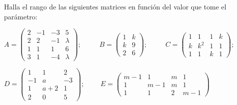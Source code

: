 \begin{ejre}
	Halla el rango de las siguientes matrices en función del valor que tome el parámetro:

\noindent $A=\left( \begin{matrix} 2&-1&-3&5\\2&2&-1&\lambda\\1&1&1&6\\3&1&-4&\lambda \end{matrix} \right); \;\;   \qquad 
B=\left( \begin{matrix} 1&k\\k&9\\2&6  \end{matrix} \right); \;\;   \qquad 
C=\left( \begin{matrix} 1&1&1&k\\k&k^2&1&1\\1&1&k&1  \end{matrix} \right);$

\noindent $D=\left( \begin{matrix} 1&1&2\\-1&a&-3\\1&a+2&1\\2&0&5  \end{matrix} \right); \;  \qquad 
E=\left( \begin{matrix} m-1&1&m&1\\1&m-1&m&1\\1&1&2&m-1  \end{matrix} \right)$
\end{ejre}


